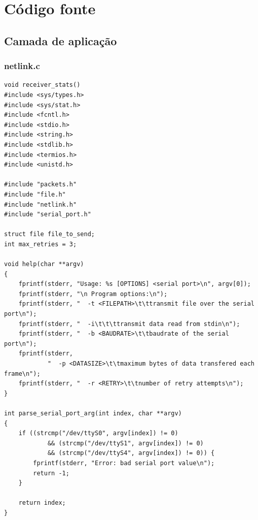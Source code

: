 \documentclass[a4paper,11pt,titlepage]{article}
\begin{document}
\appendix
\section{Código fonte}
\subsection{Camada de aplicação}
\subsubsection*{netlink.c}
\begin{lstlisting}[style=customcwithlines]
void receiver_stats()
#include <sys/types.h>
#include <sys/stat.h>
#include <fcntl.h>
#include <stdio.h>
#include <string.h>
#include <stdlib.h>
#include <termios.h>
#include <unistd.h>

#include "packets.h"
#include "file.h"
#include "netlink.h"
#include "serial_port.h"

struct file file_to_send;
int max_retries = 3;

void help(char **argv)
{
	fprintf(stderr, "Usage: %s [OPTIONS] <serial port>\n", argv[0]);
	fprintf(stderr, "\n Program options:\n");
	fprintf(stderr, "  -t <FILEPATH>\t\ttransmit file over the serial port\n");
	fprintf(stderr, "  -i\t\t\ttransmit data read from stdin\n");
	fprintf(stderr, "  -b <BAUDRATE>\t\tbaudrate of the serial port\n");
	fprintf(stderr,
			"  -p <DATASIZE>\t\tmaximum bytes of data transfered each frame\n");
	fprintf(stderr, "  -r <RETRY>\t\tnumber of retry attempts\n");
}

int parse_serial_port_arg(int index, char **argv)
{
	if ((strcmp("/dev/ttyS0", argv[index]) != 0)
			&& (strcmp("/dev/ttyS1", argv[index]) != 0)
			&& (strcmp("/dev/ttyS4", argv[index]) != 0)) {
		fprintf(stderr, "Error: bad serial port value\n");
		return -1;
	}

	return index;
}


\end{lstlisting}
\end{document}
